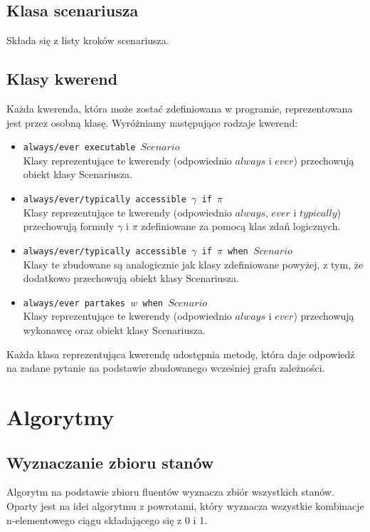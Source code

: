 \documentclass{article}
\begin{document}
\subsection{Klasa scenariusza}
Składa się z listy kroków scenariusza.

\subsection{Klasy kwerend}
Każda kwerenda, która może zostać zdefiniowana w programie, reprezentowana jest przez osobną klasę. Wyróżniamy następujące rodzaje kwerend:
\begin{itemize}
\item {\large\texttt{always/ever executable $Scenario$}} \\
Klasy reprezentujące te kwerendy (odpowiednio $always$ i $ever$) przechowują obiekt klasy Scenariusza.
\item {\large\texttt{always/ever/typically accessible $\gamma$ if $\pi$}}\\
Klasy reprezentujące te kwerendy (odpowiednio $always$, $ever$ i $typically$) przechowują formuły $\gamma$ i $\pi$ zdefiniowane za pomocą klas zdań logicznych.
\item {\large\texttt{always/ever/typically accessible $\gamma$ if $\pi$ when $Scenario$}}\\
Klasy te zbudowane są analogicznie jak klasy zdefiniowane powyżej, z tym, że dodatkowo przechowują obiekt klasy Scenariusza.
\item {\large\texttt{always/ever partakes $w$ when $Scenario$}}\\
Klasy reprezentujące te kwerendy (odpowiednio $always$ i $ever$) przechowują wykonawcę oraz obiekt klasy Scenariusza.
\end{itemize}
Każda klasa reprezentująca kwerendę udostępnia metodę, która daje odpowiedź na zadane pytanie na podstawie zbudowanego wcześniej grafu zależności.
\newpage

\section{Algorytmy}

\subsection{Wyznaczanie zbioru stanów}
Algorytm na podstawie zbioru fluentów wyznacza zbiór wszystkich stanów. Oparty jest na idei algorytmu z powrotami, który wyznacza wszystkie kombinacje n-elementowego ciągu składającego się z 0 i 1.
\end{document}
